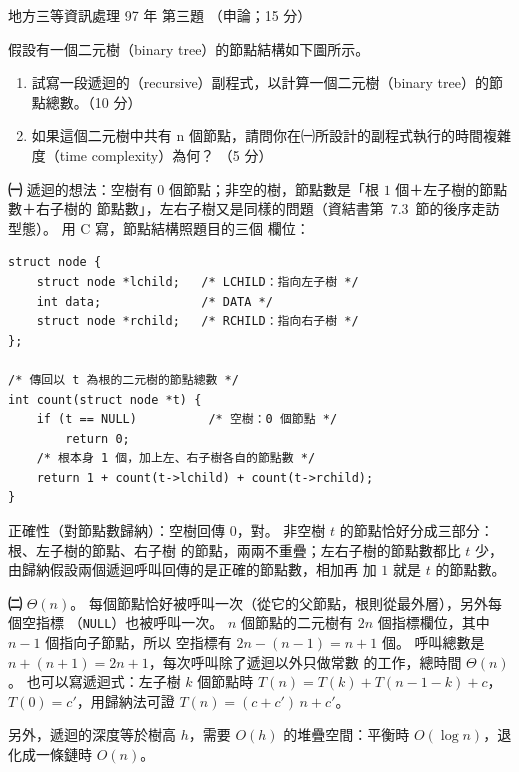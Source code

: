 \begin{pastexam}[label={px:df3-097-ds-03}]{地方三等資訊處理 97 年 第三題}
（申論；15 分）

假設有一個二元樹（binary tree）的節點結構如下圖所示。
\begin{center}
\end{center}
\begin{enumerate}[leftmargin=2.6em, labelsep=0.4em]
\item[㈠] 試寫一段遞迴的（recursive）副程式，以計算一個二元樹（binary tree）的節點總數。（10 分）
\item[㈡] 如果這個二元樹中共有 n 個節點，請問你在㈠所設計的副程式執行的時間複雜度（time complexity）為何？
（5 分）
\end{enumerate}
\end{pastexam}

\begin{pastsoln}
\textbf{㈠} 遞迴的想法：空樹有 $0$ 個節點；非空的樹，節點數是「根 $1$ 個＋左子樹的節點數＋右子樹的
節點數」，左右子樹又是同樣的問題（資結書第~7.3~節的後序走訪型態）。 用 C 寫，節點結構照題目的三個
欄位：
\begin{verbatim}
struct node {
    struct node *lchild;   /* LCHILD：指向左子樹 */
    int data;              /* DATA */
    struct node *rchild;   /* RCHILD：指向右子樹 */
};

/* 傳回以 t 為根的二元樹的節點總數 */
int count(struct node *t) {
    if (t == NULL)          /* 空樹：0 個節點 */
        return 0;
    /* 根本身 1 個，加上左、右子樹各自的節點數 */
    return 1 + count(t->lchild) + count(t->rchild);
}
\end{verbatim}
正確性（對節點數歸納）：空樹回傳 $0$，對。 非空樹 $t$ 的節點恰好分成三部分：根、左子樹的節點、右子樹
的節點，兩兩不重疊；左右子樹的節點數都比 $t$ 少，由歸納假設兩個遞迴呼叫回傳的是正確的節點數，相加再
加 $1$ 就是 $t$ 的節點數。

\textbf{㈡} $\Theta(n)$。 每個節點恰好被呼叫一次（從它的父節點，根則從最外層），另外每個空指標
（\texttt{NULL}）也被呼叫一次。 $n$ 個節點的二元樹有 $2n$ 個指標欄位，其中 $n - 1$ 個指向子節點，所以
空指標有 $2n - (n - 1) = n + 1$ 個。 呼叫總數是 $n + (n + 1) = 2n + 1$，每次呼叫除了遞迴以外只做常數
的工作，總時間 $\Theta(n)$。 也可以寫遞迴式：左子樹 $k$ 個節點時 $T(n) = T(k) + T(n - 1 - k) + c$，
$T(0) = c'$，用歸納法可證 $T(n) = (c + c')\,n + c'$。

另外，遞迴的深度等於樹高 $h$，需要 $O(h)$ 的堆疊空間：平衡時 $O(\log n)$，退化成一條鏈時 $O(n)$。
\end{pastsoln}
